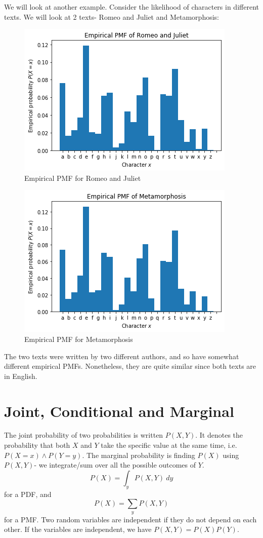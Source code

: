 \documentclass[a4paper, openany]{memoir}
\begin{document}
We will look at another example. Consider the likelihood of characters in different texts. We will look at 2 texts- Romeo and Juliet and Metamorphosis:
\begin{figure}[H]
    \centering
    \includegraphics[scale=0.5]{src/5.5 empirical pmf Romeo Juliet.png}
    \caption{Empirical PMF for Romeo and Juliet}
\end{figure}
\begin{figure}[H]
    \centering
    \includegraphics[scale=0.5]{src/5.6 empirical pmf Metamorphosis.png}
    \caption{Empirical PMF for Metamorphosis}
\end{figure}
\noindent The two texts were written by two different authors, and so have somewhat different empirical PMFs. Nonetheless, they are quite similar since both texts are in English.

\section{Joint, Conditional and Marginal}
The joint probability of two probabilities is written $P(X, Y)$. It denotes the probability that both $X$ and $Y$ take the specific value at the same time, i.e. $P(X = x) \land P(Y = y)$. The marginal probability is finding $P(X)$ using $P(X, Y)$- we integrate/sum over all the possible outcomes of $Y$.
\[P(X) = \int_y P(X, Y) \ dy\]
for a PDF, and
\[P(X) = \sum_y P(X, Y)\]
for a PMF. Two random variables are independent if they do not depend on each other. If the variables are independent, we have $P(X, Y) = P(X) P(Y)$.
\end{document}
